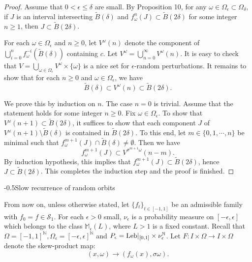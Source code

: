 \documentclass[11pt,oneside]{article}
\makeatletter
\theoremstyle{plain}
\numberwithin{equation}{section}
\numberwithin{figure}{section}
\numberwithin{table}{section}
\renewcommand{\section}{\@startsection{section}{1}{0mm}
{-\baselineskip}{0.5\baselineskip}{\Large\bf\leftline}}
\makeatother
\begin{document}
\begin{proof}

Assume that $0 < \epsilon \leq \delta$ are small. By Proposition 10, for any $\omega \in \Omega_{\epsilon} \subset \Omega_{\delta}$, if $J$ is an interval intersecting $\tilde B(\delta)$ and $f_{\omega}^n(J) \subset \tilde B(2 \delta)$ for some integer $n \geq 1$, then $J \subset \tilde B(2 \delta)$.

For each $\omega \in \Omega_{\epsilon}$ and $n \geq 0$, let $V^{\omega}(n)$ denote the component of $\bigcup_{i=0}^n f_{\omega}^{-i}(\tilde B(\delta))$ containing $c$. Let $V^{\omega} = \bigcup_{n=0}^{\infty} V^{\omega}(n)$. It is easy to check that $V = \bigcup_{\omega \in \Omega_{\epsilon}} V^{\omega} \times \{ \omega\}$ is a nice set for $\epsilon$-random perturbations. It remains to show that for each $n \geq 0$ and $\omega \in \Omega_{\epsilon}$, we have
\[
\tilde B(\delta) \subset V^{\omega}(n) \subset \tilde B(2 \delta). 
\]


We prove this by induction on $n$. The case $n=0$ is trivial. Assume that the statement holds for some integer $n \geq 0$. Fix $\omega \in \Omega_{\epsilon}$. To show that $V^{\omega}(n+1) \subset \tilde B(2 \delta)$, it suffices to show that each component $J$ of  $V^{\omega}(n+1) \setminus \tilde B( \delta)$ is contained in $\tilde B(2 \delta)$. To this end, let $m \in \{0, 1, \cdots, n \}$ be minimal such that $f_{\omega}^{m+1}(J) \cap \tilde B(\delta) \neq \emptyset$. Then we have 
\[
f_{\omega}^{m+1}(J) \subset V^{\sigma^{m+1} \omega}(n-m).
\]
By induction hypothesis, this implies that $f_{\omega}^{m+1}(J) \subset \tilde B(2 \delta)$, hence $J \subset \tilde B(2 \delta)$. This completes the induction step and the proof is finished.


\end{proof}



\section{Slow recurrence of random orbits}


From now on, unless otherwise stated, let $\{f_t \}_{t \in [-1, 1]} $ be an admissible family with $f_0 =f \in \mathcal S_1$. For each $\epsilon > 0$ small, $\nu_{\epsilon}$ is a probability measure on $[-\epsilon, \epsilon]$ which belongs to the class $\mathbb M_{\epsilon}(L)$, where $L > 1$ is a fixed constant. Recall that $\Omega = [-1, 1]^{\mathbb N}, \Omega_{\epsilon} = [-\epsilon, \epsilon]^{\mathbb N}$ and $P_{\epsilon} = {\rm Leb}|_{[0, 1]} \times \nu_{\epsilon}^{\mathbb N}$. Let $F : I \times \Omega \to I \times \Omega$ denote the skew-product map:
\[
(x, \omega) \to (f_{\omega}(x), \sigma \omega).
\]
\end{document}
